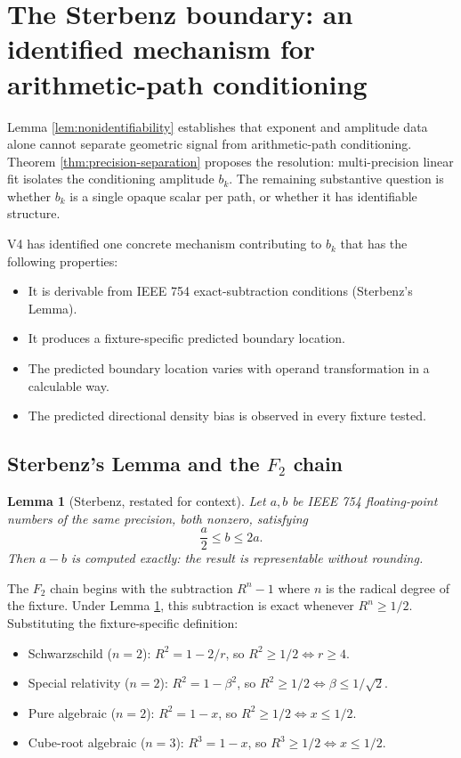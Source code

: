 \documentclass[11pt,a4paper]{article}
\newtheorem{lemma}[theorem]{Lemma}
\begin{document}
\section{The Sterbenz boundary: an identified mechanism for arithmetic-path conditioning}\label{sec:sterbenz}

Lemma \ref{lem:nonidentifiability} establishes that exponent and amplitude data alone cannot separate geometric signal from arithmetic-path conditioning. Theorem \ref{thm:precision-separation} proposes the resolution: multi-precision linear fit isolates the conditioning amplitude $b_k$. The remaining substantive question is whether $b_k$ is a single opaque scalar per path, or whether it has identifiable structure.

V4 has identified one concrete mechanism contributing to $b_k$ that has the following properties:
\begin{itemize}
    \item It is derivable from IEEE 754 exact-subtraction conditions (Sterbenz's Lemma).
    \item It produces a fixture-specific predicted boundary location.
    \item The predicted boundary location varies with operand transformation in a calculable way.
    \item The predicted directional density bias is observed in every fixture tested.
\end{itemize}

\subsection*{Sterbenz's Lemma and the $F_2$ chain}

\begin{lemma}[Sterbenz, restated for context]\label{lem:sterbenz}
Let $a, b$ be IEEE 754 floating-point numbers of the same precision, both nonzero, satisfying
\[
    \frac{a}{2} \le b \le 2a.
\]
Then $a - b$ is computed exactly: the result is representable without rounding.
\end{lemma}

The $F_2$ chain begins with the subtraction $R^n - 1$ where $n$ is the radical degree of the fixture. Under Lemma \ref{lem:sterbenz}, this subtraction is exact whenever $R^n \ge 1/2$. Substituting the fixture-specific definition:

\begin{itemize}
    \item Schwarzschild ($n=2$): $R^2 = 1 - 2/r$, so $R^2 \ge 1/2 \iff r \ge 4$.
    \item Special relativity ($n=2$): $R^2 = 1 - \beta^2$, so $R^2 \ge 1/2 \iff \beta \le 1/\sqrt{2}$.
    \item Pure algebraic ($n=2$): $R^2 = 1 - x$, so $R^2 \ge 1/2 \iff x \le 1/2$.
    \item Cube-root algebraic ($n=3$): $R^3 = 1 - x$, so $R^3 \ge 1/2 \iff x \le 1/2$.
\end{itemize}
\end{document}

